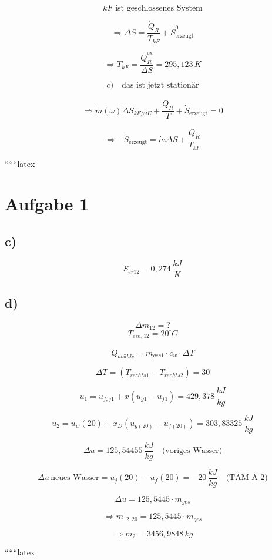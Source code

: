 \[
kF \text{ ist geschlossenes System}
\]

\[
\Rightarrow \Delta S = \frac{\dot{Q}_R}{T_{kF}} + \dot{S}_{\text{erzeugt}}^0
\]

\[
\Rightarrow T_{kF} = \frac{\dot{Q}_R^{\text{ex}}}{\Delta S} = 295,123 \, K
\]

\[
c) \quad \text{das ist jetzt stationär}
\]

\[
\Rightarrow \dot{m}(\omega) \Delta S_{kF/\omega E} + \frac{\dot{Q}_R}{T} + \dot{S}_{\text{erzeugt}} = 0
\]

\[
\Rightarrow -\dot{S}_{\text{erzeugt}} = \dot{m} \Delta S + \frac{\dot{Q}_R}{T_{kF}}
\]

``````latex


\section*{Aufgabe 1}

\subsection*{c)}
\[
\dot{S}_{er12} = 0,274 \, \frac{kJ}{K}
\]

\subsection*{d)}
\[
\Delta m_{12} = ?
\]
\[
T_{ein,12} = 20^\circ C
\]

\[
Q_{abühle} = m_{ges1} \cdot c_w \cdot \Delta \overline{T}
\]

\[
\Delta \overline{T} = (\overline{T}_{rechts1} - \overline{T}_{rechts2}) = 30
\]

\[
u_1 = u_{f,j1} + x \left( u_{g1} - u_{f1} \right) = 429,378 \, \frac{kJ}{kg}
\]

\[
u_2 = u_w(20) + x_D \left( u_{g(20)} - u_{f(20)} \right) = 303,83325 \, \frac{kJ}{kg}
\]

\[
\Delta u = 125,54455 \, \frac{kJ}{kg} \quad \text{(voriges Wasser)}
\]

\[
\Delta u \, \text{neues Wasser} = u_j(20) - u_f(20) = -20 \, \frac{kJ}{kg} \quad \text{(TAM A-2)}
\]

\[
\Delta u = 125,5445 \cdot m_{ges}
\]

\[
\Rightarrow m_{12,20} = 125,5445 \cdot m_{ges}
\]

\[
\Rightarrow m_2 = 3456,9848 \, kg
\]

``````latex


